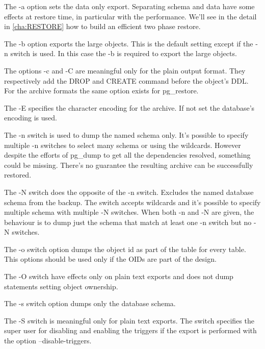 The -a option sets the data only export. Separating schema and data have some effects at restore 
time, in particular with the performance. We'll see in the detail in \ref{cha:RESTORE} how to 
build an efficient two phase restore.\newline

The -b option exports the large objects. This is the default setting except if the -n switch is 
used. In this case the -b is required to export the large objects.\newline

The options -c and -C are meaningful only for the plain output format. They respectively add the 
DROP and CREATE command before the object's DDL. For the archive formats the same option exists for 
pg\_restore.\newline

The -E specifies the character encoding for the archive. If not set the database's encoding is 
used.\newline 

The -n switch is used to dump the named schema only. It's possible to specify multiple -n switches 
to select many schema or using the wildcards. However despite the efforts of pg\_dump to get all 
the dependencies resolved, something could be missing. There's no guarantee the resulting archive 
can be successfully restored.\newline

The -N switch does the opposite of the -n switch. Excludes the named database schema from the backup. The 
switch accepts wildcards and it's possible to specify multiple schema with multiple -N switches. When both 
-n and -N are given, the behaviour is to dump just the schema that match at least one -n switch but no -N 
switches. \newline

The -o switch option dumps the object id as part of the table for every table. This options should be 
used only if the OIDs are part of the design. \newline

The -O switch have effects only on plain text exports and does not dump statements setting object 
ownership.\newline

The -s switch option dumps only the database schema.\newline

The -S switch is meaningful only for plain text exports. The switch specifies the super user for disabling 
and enabling the triggers if the export is performed with the option --disable-triggers. \newline

